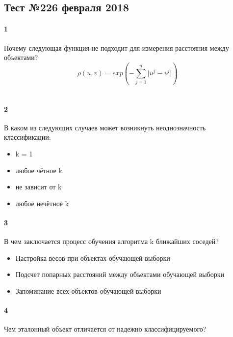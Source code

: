 \documentclass[a4paper,12pt]{article}
\begin{document}
  \subsection*{Тест №2\hfill{26 февраля 2018}}

  \paragraph{1} Почему следующая функция не подходит для измерения расстояния между объектами?\\
  $$\rho(u, v) = exp(-\sum\limits_{j=1}^n \vert u^j - v^j \vert)$$\\
  \makebox[\linewidth]{\hrulefill}
  \makebox[\linewidth]{\hrulefill}
  
  \paragraph{2} В каком из следующих случаев может возникнуть неоднозначность классификации:
  \begin{itemize}
    \item k = 1
    \item любое чётное k
    \item не зависит от k
    \item любое нечётное k 
  \end{itemize}
  
  \paragraph{3} В чем заключается процесс обучения алгоритма k ближайших соседей?
  \begin{itemize}
    \item Настройка весов при объектах обучающей выборки
    \item Подсчет попарных расстояний между объектами обучающей выборки
    \item Запоминание всех объектов обучающей выборки
  \end{itemize}
  
  \paragraph{4} Чем эталонный объект отличается от надежно классифицируемого?\\
  
  \makebox[\linewidth]{\hrulefill}
  \makebox[\linewidth]{\hrulefill}
    
\end{document}
